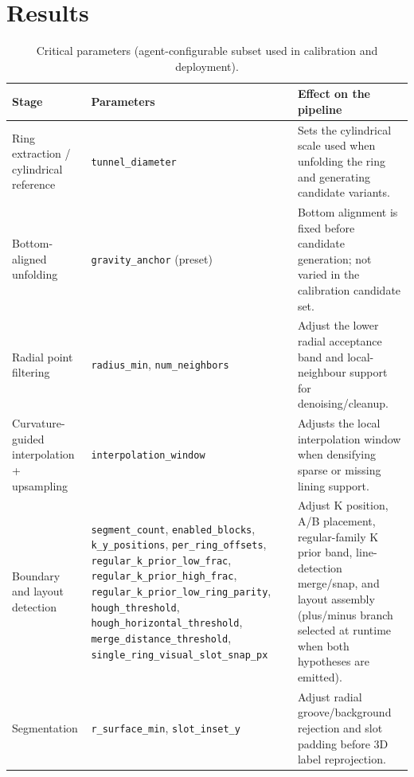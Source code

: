\documentclass[a4paper,fleqn]{cas-dc}
\begin{document}
{\FloatBarrier %
\clearpage
\section{Results}\label{sec:results}%
\begin{table}[t]
\caption{
Critical parameters (agent-configurable subset used in calibration and deployment).
}
\label{tab:workflow_critical_parameters}
\centering
\footnotesize
\begin{tabular}{p{}p{}p{}}
\toprule
Stage & Parameters & Effect on the pipeline \\
\midrule
Ring extraction / cylindrical reference
& \texttt{tunnel\_diameter}
& Sets the cylindrical scale used when unfolding the ring and generating candidate variants. \\
\addlinespace
Bottom-aligned unfolding
& \texttt{gravity\_anchor} (preset)
& Bottom alignment is fixed before candidate generation; not varied in the calibration candidate set. \\
\addlinespace
Radial point filtering
& \texttt{radius\_min}, \texttt{num\_neighbors}
& Adjust the lower radial acceptance band and local-neighbour support for denoising/cleanup. \\
\addlinespace
Curvature-guided interpolation + upsampling
& \texttt{interpolation\_window}
& Adjusts the local interpolation window when densifying sparse or missing lining support. \\
\addlinespace
Boundary and layout detection
& \texttt{segment\_count}, \texttt{enabled\_blocks}, \texttt{k\_y\_positions}, \texttt{per\_ring\_offsets}, \texttt{regular\_k\_prior\_low\_frac}, \texttt{regular\_k\_prior\_high\_frac}, \texttt{regular\_k\_prior\_low\_ring\_parity}, \texttt{hough\_threshold}, \texttt{hough\_horizontal\_threshold}, \texttt{merge\_distance\_threshold}, \texttt{single\_ring\_visual\_slot\_snap\_px}
& Adjust K position, A/B placement, regular-family K prior band, line-detection merge/snap, and layout assembly (plus/minus branch selected at runtime when both hypotheses are emitted). \\
\addlinespace
Segmentation
& \texttt{r\_surface\_min}, \texttt{slot\_inset\_y}
& Adjust radial groove/background rejection and slot padding before 3D label reprojection. \\
\bottomrule
\end{tabular}
\end{table}

}
\end{document}

